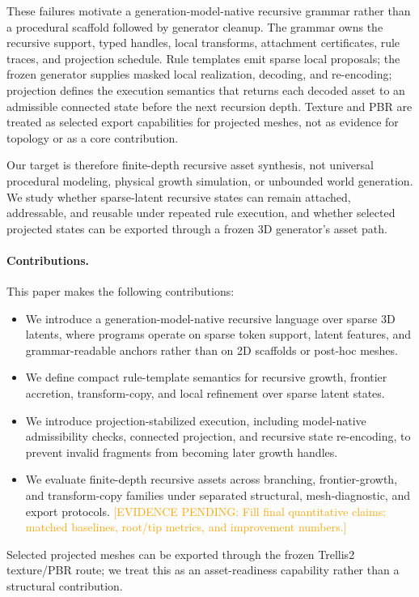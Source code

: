 \documentclass[sigconf,anonymous,review]{acmart}
\providecommand{\EvidencePending}[1]{\textcolor{orange}{[EVIDENCE PENDING: #1]}}
\begin{document}
These failures motivate a generation-model-native recursive grammar rather than a procedural scaffold followed by generator cleanup. The grammar owns the recursive support, typed handles, local transforms, attachment certificates, rule traces, and projection schedule. Rule templates emit sparse local proposals; the frozen generator supplies masked local realization, decoding, and re-encoding; projection defines the execution semantics that returns each decoded asset to an admissible connected state before the next recursion depth. Texture and PBR are treated as selected export capabilities for projected meshes, not as evidence for topology or as a core contribution.

Our target is therefore finite-depth recursive asset synthesis, not universal procedural modeling, physical growth simulation, or unbounded world generation. We study whether sparse-latent recursive states can remain attached, addressable, and reusable under repeated rule execution, and whether selected projected states can be exported through a frozen 3D generator's asset path.

\paragraph{Contributions.}
This paper makes the following contributions:
\begin{itemize}
  \item We introduce a generation-model-native recursive language over sparse 3D latents, where programs operate on sparse token support, latent features, and grammar-readable anchors rather than on 2D scaffolds or post-hoc meshes.
  \item We define compact rule-template semantics for recursive growth, frontier accretion, transform-copy, and local refinement over sparse latent states.
  \item We introduce projection-stabilized execution, including model-native admissibility checks, connected projection, and recursive state re-encoding, to prevent invalid fragments from becoming later growth handles.
  \item We evaluate finite-depth recursive assets across branching, frontier-growth, and transform-copy families under separated structural, mesh-diagnostic, and export protocols. \EvidencePending{Fill final quantitative claims: matched baselines, root/tip metrics, and improvement numbers.}
\end{itemize}
Selected projected meshes can be exported through the frozen Trellis2 texture/PBR route; we treat this as an asset-readiness capability rather than a structural contribution.
\end{document}
